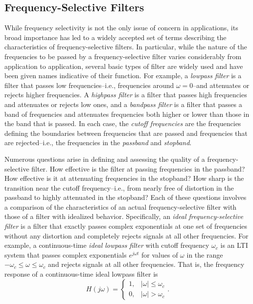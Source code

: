 \documentclass[a4paper,twoside]{book}
\begin{document}
\subsection{Frequency-Selective Filters}

While frequency selectivity is not the only issue of concern in applications, its broad importance has led to a widely accepted set of terms describing the characteristics of frequency-selective filters. In particular, while the nature of the frequencies to be passed by a frequency-selective filter varies considerably from application to application, several basic types of filter are widely used and have been given names indicative of their function. For example, a \textit{lowpass filter} is a filter that passes low frequencies--i.e., frequencies around $\omega=0$--and attenuates or rejects higher frequencies. A \textit{highpass filter} is a filter that passes high frequencies and attenuates or rejects low ones, and a \textit{bandpass filter} is a filter that passes a band of frequencies and attenuates frequencies both higher or lower than those in the band that is passed. In each case, the \textit{cutoff frequencies} are the frequencies defining the boundaries between frequencies that are passed and frequencies that are rejected--i.e., the frequencies in the \textit{passband} and \textit{stopband}.

Numerous questions arise in defining and assessing the quality of a frequency-selective filter. How effective is the filter at passing frequencies in the passband? How effective is it at attenuating frequencies in the stopband? How sharp is the transition near the cutoff frequency--i.e., from nearly free of distortion in the passband to highly attenuated in the stopband? Each of these questions involves a comparison of the characteristics of an actual frequency-selective filter with those of a filter with idealized behavior. Specifically, an \textit{ideal frequency-selective filter} is a filter that exactly passes complex exponentials at one set of frequencies without any distortion and completely rejects signals at all other frequencies. For example, a continuous-time \textit{ideal lowpass filter} with cutoff frequency $\omega_c$ is an LTI system that passes complex exponentials $e^{j\omega t}$ for values of $\omega$ in the range $-\omega_c\le\omega\le\omega_c$ and rejects signals at all other frequencies. That is, the frequency response of a continuous-time ideal lowpass filter is
\begin{equation}
    \left.H(j\omega)=\left\{\begin{array}{ll}1,&|\omega|\leq\omega_c\\0,&|\omega|>\omega_c\end{array}\right.\right..
    \label{3.140}
\end{equation}
\end{document}
